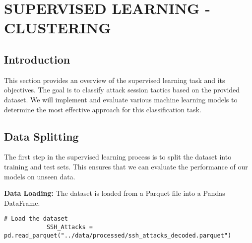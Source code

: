 

\section{SUPERVISED LEARNING - CLUSTERING}


    \subsection{Introduction}
    
        This section provides an overview of the supervised learning task and its objectives. The goal is to classify attack session tactics based on the provided dataset. We will implement and evaluate various machine learning models to determine the most effective approach for this classification task.

    \subsection{Data Splitting}
    
        The first step in the supervised learning process is to split the dataset into training and test sets. This ensures that we can evaluate the performance of our models on unseen data.

        \textbf{Data Loading:} The dataset is loaded from a Parquet file into a Pandas DataFrame.

        \begin{lstlisting}[caption={Load the dataset}, label={lst:load_dataset}]
            # Load the dataset
            SSH_Attacks = pd.read_parquet("../data/processed/ssh_attacks_decoded.parquet")
        \end{lstlisting}
        
        \vspace{1em}

